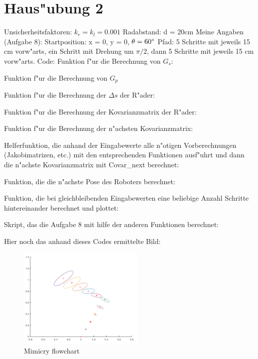 \documentclass[11pt]{article}
\begin{document}


    \lstset{style=mystyle}

\section{Haus"ubung 2}\label{sec:h2}
    Unsicherheitsfaktoren: $k_{r} = k_{l} = 0.001$\newline
    Radabstand: d = 20cm\newline
    Meine Angaben (Aufgabe 8):\newline
    Startposition: x = 0, y = 0, $\theta = 60\degree$\newline
    Pfad: 5 Schritte mit jeweils 15 cm vorw"arts, ein Schritt mit Drehung um $\pi/2$, dann 5 Schritte mit jeweils 15 cm vorw"arts.\newline
    Code:\newline
Funktion f"ur die Berechnung von $G_{s}$:

Funktion f"ur die Berechnung von $G_{p}$

Funktion f"ur die Berechnung der $\Delta s$ der R"ader:

Funktion f"ur die Berechnung der Kovarianzmatrix der R"ader:

Funktion f"ur die Berechnung der n"achsten Kovarianzmatrix:

Helferfunktion, die anhand der Eingabewerte alle n"otigen Vorberechnungen (Jakobimatrizen, etc.) mit den entsprechenden Funktionen ausf"uhrt und dann die n"achste Kovarianzmatrix mit Covar\_next berechnet:

Funktion, die die n"achste Pose des Roboters berechnet:

Funktion, die bei gleichbleibenden Eingabewerten eine beliebige Anzahl Schritte hintereinander berechnet und plottet:

Skript, das die Aufgabe 8 mit hilfe der anderen Funktionen berechnet:

    Hier noch das anhand dieses Codes ermittelte Bild:
    \begin{figure}[H]
        \centering
        \includegraphics[width=6cm]{aufgabeResultat.png}
        \caption{Mimicry flowchart}
        \label{fig:result}
    \end{figure}
\end{document}

